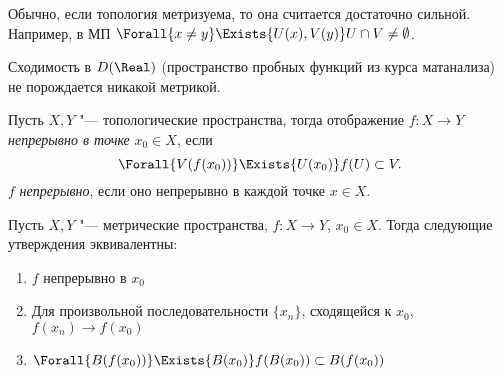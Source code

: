\documentclass[main]{subfiles}
\begin{document}
\begin{remark}
  Обычно, если топология метризуема,
  то она считается достаточно сильной.
  Например, в МП \( \Forall{x \ne y}
  \Exists{U(x), V(y)} U \cap V \ne \emptyset \).
\end{remark}

\begin{exercise} %
  Сходимость в \( D(\Real) \)
  (пространство пробных функций из курса
  матанализа)
  не порождается никакой метрикой.
\end{exercise}

\begin{definition}
  Пусть \( X, Y \) "--- топологические пространства,
  тогда отображение \( f : X \to Y \)
  \emph{непрерывно в точке} \( x_0 \in X \),
  если
  \[
    \Forall{V(f(x_0))} \Exists{U(x_0)} f(U) \subset V.
  \]
  \( f \) \emph{непрерывно},
  если оно непрерывно в каждой точке \( x \in X \).
\end{definition}

\begin{exercise}
  Пусть \( X, Y \) "--- метрические пространства,
  \( f : X \to Y \), \( x_0 \in X \).
  Тогда следующие утверждения эквивалентны:
  \begin{enumerate}
    \item \( f \) непрерывно в \( x_0 \)
    \item Для произвольной последовательности
      \( \{ x_n \} \), сходящейся к \( x_0 \),
      \( f(x_n) \to f(x_0) \)
    \item \( \Forall{B(f(x_0))} \Exists{B(x_0)}
      f(B(x_0)) \subset B(f(x_0)) \)
  \end{enumerate}
\end{exercise}
\end{document}
